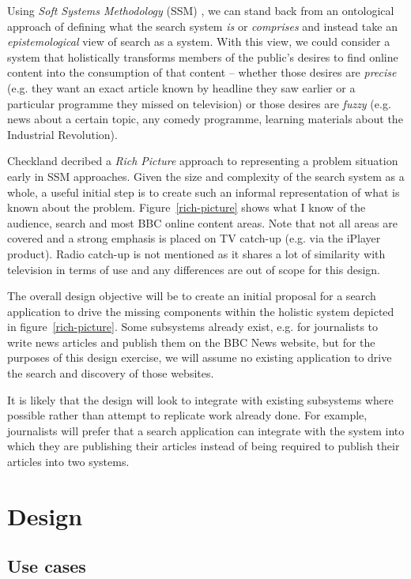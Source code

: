 \documentclass[a4paper]{report}
\begin{document}
Using \emph{Soft Systems Methodology} (SSM)
\cite{checkland2006learning}, we can stand back from
an ontological approach of defining what the search system \emph{is} or
\emph{comprises} and instead take an \emph{epistemological} view of search
as a system. With this view, we could consider a system that holistically
transforms members of the public's desires to find online content into
the consumption of that content -- whether those desires are \emph{precise}
(e.g. they want an exact article known by headline they saw earlier or a
particular programme they missed on television) or those desires are
\emph{fuzzy} (e.g. news about a certain topic, any comedy programme, learning
materials about the Industrial Revolution).

Checkland \cite{checkland1990soft} decribed a \emph{Rich Picture} approach to
representing a problem situation early in SSM approaches.
Given the size and complexity of the
search system as a whole, a useful initial step is to create such an informal
representation of what is known about the problem. Figure~\ref{rich-picture}
shows what I know of the audience, search and most BBC online content areas.
Note that not all areas are covered and a strong emphasis is placed on TV
catch-up (e.g. via the iPlayer product). Radio catch-up is not mentioned
as it shares a lot of similarity with television in terms of use and any
differences are out of scope for this design.

The overall design objective will be to create an initial proposal for a
search application to drive the missing components within the holistic
system depicted in figure~\ref{rich-picture}. Some subsystems already
exist, e.g. for journalists to write news articles and publish them on the
BBC News website, but for the purposes of this design exercise, we will
assume no existing application to drive the search and discovery of
those websites.

It is likely that the design will look to integrate with
existing subsystems where possible rather than attempt to replicate
work already done. For example, journalists will prefer that a search
application can integrate with the system into which they are publishing
their articles instead of being required to publish their articles into
two systems.

\chapter{Design}

\section{Use cases}
\end{document}
